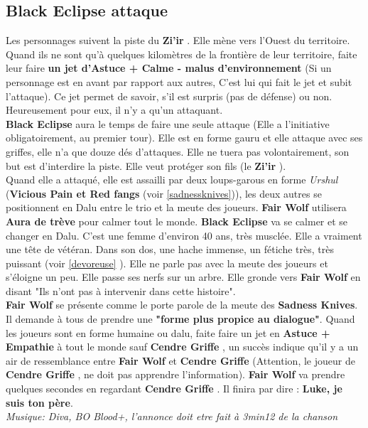 \documentclass[oneside,12pt]{book}
\newcommand{\Luke}{\textbf{Cendre Griffe} }
\newcommand{\BlackEclipse}{\textbf{Black Eclipse} }
\newcommand{\Thomas}{\textbf{Zi'ir} }
\begin{document}
\begin{flushleft}
\section{\BlackEclipse attaque}
\label{black_eclipse}
Les personnages suivent la piste du \Thomas. Elle mène vers l'Ouest du territoire. Quand ils ne sont qu'à quelques kilomètres de la frontière de leur territoire, faite leur faire \textbf{un jet d'Astuce + Calme - malus d'environnement} (Si un personnage est en avant par rapport aux autres, C'est lui qui fait le jet et subit l'attaque). 
Ce jet permet de savoir, s'il est surpris (pas de défense) ou non. Heureusement pour eux, il n'y a qu'un attaquant. \\
\BlackEclipse aura le temps de faire une seule attaque (Elle a l'initiative obligatoirement, au premier tour). 
Elle est en forme gauru et elle attaque avec ses griffes, elle n'a que douze dés d'attaques. 
Elle ne tuera pas volontairement, son but est d'interdire la piste.
Elle veut protéger son fils (le \Thomas).\\
Quand elle a attaqué, elle est assailli par deux loups-garous en forme \textit{Urshul} (\textbf{Vicious Pain et Red fangs} (voir \ref{sadnessknives})), les deux autres se positionnent en Dalu entre le trio et la meute des joueurs. 
\textbf{Fair Wolf} utilisera \textbf{Aura de trève} pour calmer tout le monde.
\BlackEclipse va se calmer et se changer en Dalu. C'est une femme d'environ 40 ans, très musclée. Elle a vraiment une tête de vétéran. Dans son dos, une hache immense, un fétiche très, très puissant (voir \ref{devoreuse} ). Elle ne parle pas avec la meute des joueurs et s'éloigne un peu. Elle passe ses nerfs sur un arbre. Elle gronde vers \textbf{Fair Wolf} en disant "Ils n'ont pas à intervenir dans cette histoire". \\ 
\textbf{Fair Wolf} se présente comme le porte parole de la meute des \textbf{Sadness Knives}. Il demande à tous de prendre une \textbf{"forme plus propice au dialogue"}. Quand les joueurs sont en forme humaine ou dalu, faite faire un jet en \textbf{Astuce + Empathie} à tout le monde sauf \Luke, un succès indique qu'il y a un air de ressemblance entre \textbf{Fair Wolf} et \Luke (Attention, le joueur de \Luke, ne doit pas apprendre l'information). \textbf{Fair Wolf} va prendre quelques secondes en regardant \Luke. Il finira par dire :  {\Large \textbf{Luke, je suis ton père}}. \\
\textit{Musique: Diva, BO Blood+, l'annonce doit etre fait à 3min12 de la chanson} \\


\end{flushleft}
\end{document}
